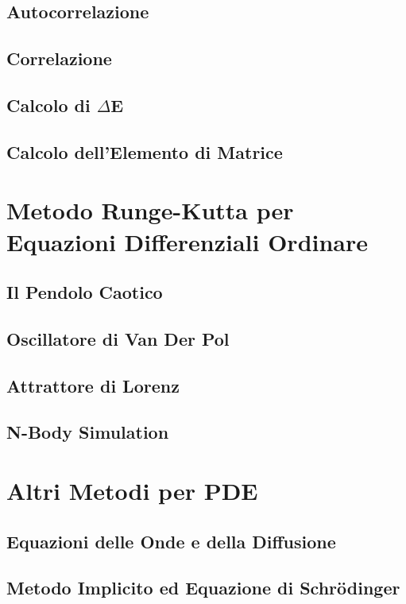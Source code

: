 \documentclass[a4paper,11pt]{report}
\begin{document}
\section{Autocorrelazione}
\section{Correlazione}
\section{Calcolo di $\Delta$E}
\section{Calcolo dell'Elemento di Matrice}

\chapter{\huge Metodo Runge-Kutta per Equazioni Differenziali Ordinare}

\section{Il Pendolo Caotico}
\section{Oscillatore di Van Der Pol}
\section{Attrattore di Lorenz}
\section{N-Body Simulation}

\chapter{\huge Altri Metodi per PDE}

\section{Equazioni delle Onde e della Diffusione}
\section{Metodo Implicito ed Equazione di Schr\"{o}dinger}
\end{document}
